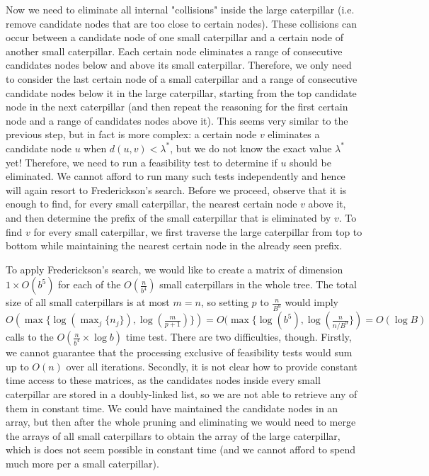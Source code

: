 \documentclass[11pt,a4paper]{article}
\theoremstyle{definition}
\theoremstyle{remark}
\begin{document}
Now we need to eliminate all internal "collisions" inside the large caterpillar (i.e. remove candidate nodes that
are too close to certain nodes). These collisions can occur between a candidate node of one small caterpillar
and a certain node of another small caterpillar. Each certain node eliminates a range of consecutive
candidates nodes below and above its small caterpillar. Therefore, we only need to consider the 
last certain node of a small caterpillar and a range of consecutive candidate nodes below it in the
large caterpillar, starting from the top candidate node in the next caterpillar (and then repeat
the reasoning for the first certain node and a range of candidates nodes above it). This seems very similar
to the previous step, but in fact is more complex: a certain node $v$ eliminates a candidate node $u$ when
$d(u,v)<\lambda^{*}$, but we do not know the exact value $\lambda^{*}$ yet! Therefore, we need to run
a feasibility test to determine if $u$ should be eliminated. We cannot afford to run many such tests
independently and hence will again resort to Frederickson's search. Before we proceed, observe that
it is enough to find, for every small caterpillar, the nearest certain node $v$ above it, and then determine
the prefix of the small caterpillar that is eliminated by $v$. To find $v$ for every small caterpillar,
we first traverse the large caterpillar from top to bottom while maintaining the nearest certain node
in the already seen prefix.

To apply Frederickson's search, we would like to create a matrix of dimension $1\times O(b^{5})$
for each of the $O(\frac{n}{b^{4}})$ small caterpillars in the whole tree. The total size of all small
caterpillars is at most $m=n$, so setting $p$ to $\frac{n}{B^9}$ would imply
$O(\max \lbrace \log(\max_{j} \lbrace n_j \rbrace), \log(\frac{m}{p+1}) \rbrace) = O(\max \lbrace \log (b^{5}), \log(\frac{n}{n/B^{9}} \rbrace) = O(\log B)$ calls to the $O(\frac{n}{b^{4}} \times \log b)$ time test.
There are two difficulties, though. Firstly, we cannot guarantee that the processing exclusive of feasibility tests
would sum up to $O(n)$ over all iterations. Secondly, it is not clear how to provide constant time access
to these matrices, as the candidates nodes inside every small caterpillar are stored in a doubly-linked list,
so we are not able to retrieve any of them in constant time. We could have maintained the candidate
nodes in an array, but then after the whole pruning and eliminating we would need to merge the arrays
of all small caterpillars to obtain the array of the large caterpillar, which is does not seem possible
in constant time (and we cannot afford to spend much more per a small caterpillar).
\end{document}
